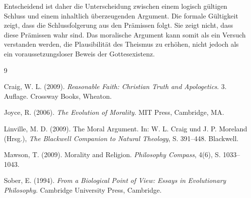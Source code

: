 \documentclass[a4paper,11pt]{article}
\begin{document}
	Entscheidend ist daher die Unterscheidung zwischen einem logisch
	gültigen Schluss und einem inhaltlich überzeugenden Argument.
	Die formale Gültigkeit zeigt, dass die Schlussfolgerung aus den
	Prämissen folgt. Sie zeigt nicht, dass diese Prämissen wahr
	sind. Das moralische Argument kann somit als ein Versuch
	verstanden werden, die Plausibilität des Theismus zu erhöhen,
	nicht jedoch als ein voraussetzungsloser Beweis der
	Gottesexistenz.
	
	\begin{thebibliography}{9}
		
		Craig, W. L. (2009).
		\textit{Reasonable Faith: Christian Truth and Apologetics}.
		3. Auflage. Crossway Books, Wheaton.
		
		Joyce, R. (2006).
		\textit{The Evolution of Morality}.
		MIT Press, Cambridge, MA.
		
		Linville, M. D. (2009).
		The Moral Argument.
		In: W. L. Craig und J. P. Moreland (Hrsg.),
		\textit{The Blackwell Companion to Natural Theology},
		S. 391--448. Blackwell.
		
		Mawson, T. (2009).
		Morality and Religion.
		\textit{Philosophy Compass}, 4(6), S. 1033--1043.
		
		Sober, E. (1994).
		\textit{From a Biological Point of View: Essays in Evolutionary Philosophy}.
		Cambridge University Press, Cambridge.
		
	\end{thebibliography}
	
\end{document}
